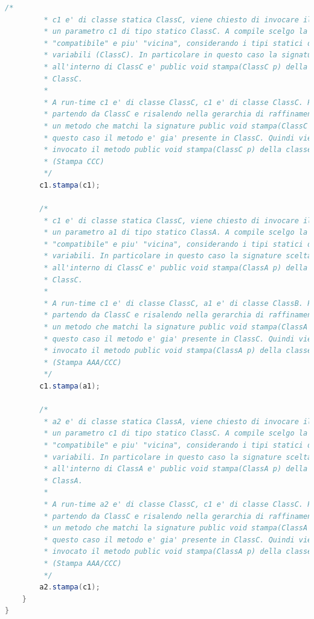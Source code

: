\documentclass{article}
\begin{document}
\begin{lstlisting}[language=Java,escapechar=|]
		/*
		 * c1 e' di classe statica ClassC, viene chiesto di invocare il metodo stampa su
		 * un parametro c1 di tipo statico ClassC. A compile scelgo la signature
		 * "compatibile" e piu' "vicina", considerando i tipi statici delle
		 * variabili (ClassC). In particolare in questo caso la signature scelta
		 * all'interno di ClassC e' public void stampa(ClassC p) della classe
		 * ClassC.
		 * 
		 * A run-time c1 e' di classe ClassC, c1 e' di classe ClassC. Per questo
		 * partendo da ClassC e risalendo nella gerarchia di raffinamento cerco
		 * un metodo che matchi la signature public void stampa(ClassC p). In
		 * questo caso il metodo e' gia' presente in ClassC. Quindi viene
		 * invocato il metodo public void stampa(ClassC p) della classe ClassC
		 * (Stampa CCC)
		 */
		c1.stampa(c1);
		
		/*
		 * c1 e' di classe statica ClassC, viene chiesto di invocare il metodo stampa su
		 * un parametro a1 di tipo statico ClassA. A compile scelgo la signature
		 * "compatibile" e piu' "vicina", considerando i tipi statici delle
		 * variabili. In particolare in questo caso la signature scelta
		 * all'interno di ClassC e' public void stampa(ClassA p) della classe
		 * ClassC.
		 * 
		 * A run-time c1 e' di classe ClassC, a1 e' di classe ClassB. Per questo
		 * partendo da ClassC e risalendo nella gerarchia di raffinamento cerco
		 * un metodo che matchi la signature public void stampa(ClassA p). In
		 * questo caso il metodo e' gia' presente in ClassC. Quindi viene
		 * invocato il metodo public void stampa(ClassA p) della classe ClassC
		 * (Stampa AAA/CCC)
		 */
		c1.stampa(a1);

		/*
		 * a2 e' di classe statica ClassA, viene chiesto di invocare il metodo stampa su
		 * un parametro c1 di tipo statico ClassC. A compile scelgo la signature
		 * "compatibile" e piu' "vicina", considerando i tipi statici delle
		 * variabili. In particolare in questo caso la signature scelta
		 * all'interno di ClassA e' public void stampa(ClassA p) della classe
		 * ClassA.
		 * 
		 * A run-time a2 e' di classe ClassC, c1 e' di classe ClassC. Per questo
		 * partendo da ClassC e risalendo nella gerarchia di raffinamento cerco
		 * un metodo che matchi la signature public void stampa(ClassA p). In
		 * questo caso il metodo e' gia' presente in ClassC. Quindi viene
		 * invocato il metodo public void stampa(ClassA p) della classe ClassC
		 * (Stampa AAA/CCC)
		 */
		a2.stampa(c1);
	}
}
\end{lstlisting}
\end{document}
